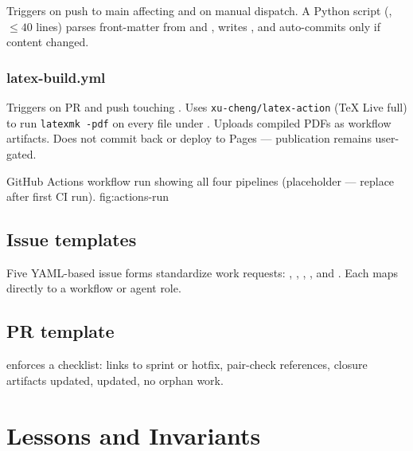 \documentclass[a4paper,11pt,openany]{report}
\begin{document}
Triggers on push to main affecting  and on manual dispatch.
A Python script (, $\leq 40$ lines)
parses front-matter from  and
, writes ,
and auto-commits only if content changed.

\subsection{latex-build.yml}

Triggers on PR and push touching . Uses
\texttt{xu-cheng/latex-action} (TeX Live full) to run \texttt{latexmk~-pdf}
on every file under . Uploads compiled PDFs as workflow
artifacts. Does not commit back or deploy to Pages --- publication remains
user-gated.

%
  {GitHub Actions workflow run showing all four pipelines (placeholder --- replace after first CI run).}%
  {fig:actions-run}

\section{Issue templates}

Five YAML-based issue forms standardize work requests:
, , ,
, and . Each maps directly to
a workflow or agent role.

\section{PR template}

 enforces a checklist: links to
sprint or hotfix, pair-check references, closure artifacts updated,
 updated, no orphan work.



\chapter{Lessons and Invariants}
\label{ch:lessons}
\end{document}
